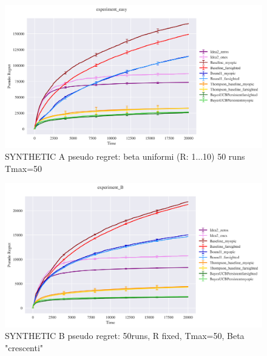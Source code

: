 \begin{figure}[h]
	\includegraphics[width=16cm]{./images/experiment_easy ANALYTICS.png}
	\centering	
	\caption{SYNTHETIC A pseudo regret: beta uniformi (R: 1...10) 50 runs Tmax=50}
\end{figure}
\begin{figure}[h]
	\includegraphics[width=16cm]{./images/experiment_B ANALYTICS.png}
	\centering	
	\caption{SYNTHETIC B pseudo regret: 50runs,  R fixed, Tmax=50, Beta "crescenti" }
\end{figure}

